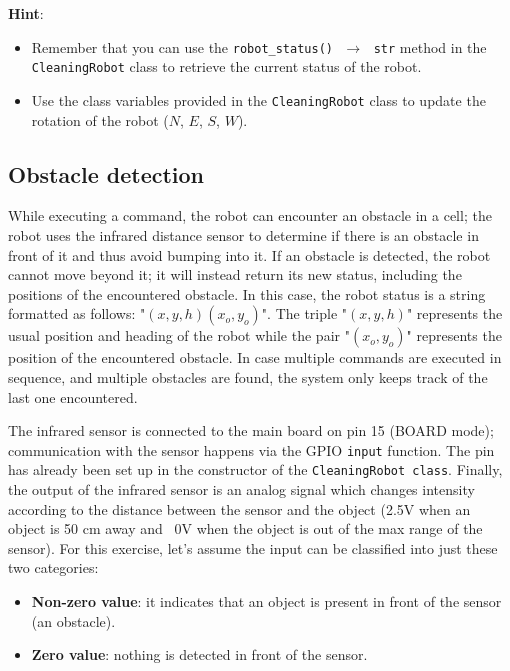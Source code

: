 \noindent\textbf{Hint}:
\begin{itemize}
    \item Remember that you can use the \texttt{robot\_status() $\,\to\,$ str} method in the \texttt{CleaningRobot} class to retrieve the current status of the robot.
    \item Use the class variables provided in the \texttt{CleaningRobot} class to update the rotation of the robot ($N$, $E$, $S$, $W$).
\end{itemize}


\subsection{Obstacle detection}
While executing a command, the robot can encounter an obstacle in a cell;  the robot uses the infrared distance sensor to determine if there is an obstacle in front of it and thus avoid bumping into it. 
If an obstacle is detected, the robot cannot move beyond it; it will instead return its new status, including the positions of the encountered obstacle. In this case, the robot status is a string formatted as follows: "$(x,y,h)(x_o,y_o)$". The triple "$(x,y,h)$" represents the usual position and heading of the robot while the pair "$(x_o,y_o)$" represents the position of the encountered obstacle.
In case multiple commands are executed in sequence, and multiple obstacles are found, the system only keeps track of the last one encountered.

The infrared sensor is connected to the main board on pin 15 (BOARD mode); communication with the sensor happens via the GPIO \texttt{input} function. The pin has already been set up in the constructor of the \texttt{CleaningRobot class}. 
Finally, the output of the infrared sensor is an analog signal which changes intensity according to the distance between the sensor and the object (\ie 2.5V when an object is 50 cm away and ~0V when the object is out of the max range of the sensor). For this exercise, let's assume the input can be classified into just these two categories:
\begin{itemize}
    \item \textbf{Non-zero value}: it indicates that an object is present in front of the sensor (\ie an obstacle).
    \item \textbf{Zero value}: nothing is detected in front of the sensor.
\end{itemize}

